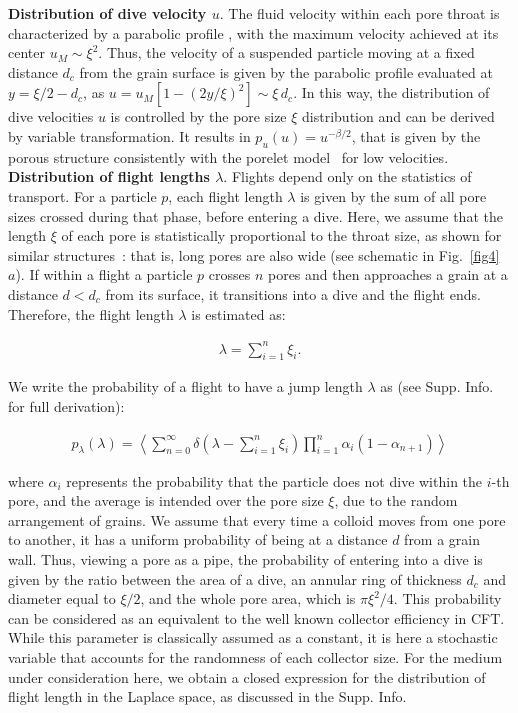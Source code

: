 \documentclass[singlecolumn,pre,notitlepage,preprintnumbers,floatfix,superscriptaddress]{revtex4-1}
\begin{document}
\noindent
\textbf{Distribution of dive velocity $u$}.
The fluid velocity within each pore throat is characterized by a parabolic profile \cite{deAnnaPRF2017,DentzJFM2018}, with the maximum velocity achieved at its center $u_M \sim \xi^2$. Thus, the velocity of a suspended particle moving at a fixed distance $d_c$ from the grain surface is given by the parabolic profile evaluated at $y = \xi/2 - d_c$, as $u = u_M[1 - (2 y/ \xi)^2] \sim \xi \, d_c$. In this way, the distribution of dive velocities $u$ is controlled by the pore size $\xi$ distribution and can be derived by variable transformation. It results in $p_u(u) = u^{-\beta/2}$, that is given by the porous structure consistently with the porelet model~\cite{deAnnaPRF} for low velocities.\\

\noindent
\textbf{Distribution of flight lengths $\lambda$}. Flights depend only on the statistics of transport. For a particle $p$, each flight length $\lambda$ is given by the sum of all pore sizes crossed during that phase, before entering a dive. Here, we assume that the length $\xi$ of each pore is statistically proportional to the throat size, as shown for similar structures~\cite{deAnnaPRF2017,jiao_PRF2024}: that is, long pores are also wide (see schematic in Fig.~\ref{fig4}~$a$). If within a flight a particle $p$ crosses $n$ pores and then approaches a grain at a distance $d < d_c$ from its surface, it transitions into a dive and the flight ends. Therefore, the flight length $\lambda$ is estimated as:

\begin{align}\label{eq:ell}
	\lambda = \sum\limits_{i = 1}^{n} \xi_i.
\end{align}

We write the probability of a flight to have a jump length $\lambda$ as (see Supp. Info. for full derivation):

\begin{align}\label{lambdaeq}
	p_\lambda(\lambda) = \left\langle \sum\limits_{n = 0}^\infty \delta \left(\lambda - \sum\limits_{i = 1}^{n} \xi_i\right) \prod\limits_{i = 1}^n \alpha_i (1 - \alpha_{n+1}) \right\rangle
\end{align}

where $\alpha_i$ represents the probability that the particle does not dive within the $i$-th pore, and the average is intended over the pore size $\xi$, due to the random arrangement of grains. We assume that every time a colloid moves from one pore to another, it has a uniform probability of being at a distance $d$ from a grain wall. Thus, viewing a pore as a pipe, the probability of entering into a dive is given by the ratio between the area of a dive, an annular ring of thickness $d_c$ and diameter equal to $\xi / 2$, and the whole pore area, which is $\pi \xi^2 / 4$. This probability can be considered as an equivalent to the well known collector efficiency in CFT. While this parameter is classically assumed as a constant, it is here a stochastic variable that accounts for the randomness of each collector size. For the medium under consideration here, we obtain a closed expression for the distribution of flight length in the Laplace space, as discussed in the Supp. Info. \\
\end{document}
